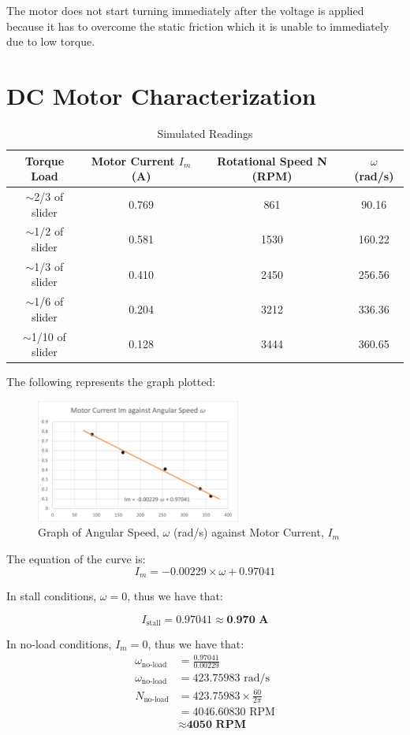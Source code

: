 \documentclass[a4paper,12pt,oneside, tikz]{book}
\begin{document}
The motor does not start turning immediately after the voltage is applied because it has to overcome the static friction which it is unable to immediately due to low torque.

\chapter{DC Motor Characterization}
\begin{table}[H]
    \centering
    \begin{tabular}{|c|c|c|c|}
         \hline Torque Load & Motor Current $I_m$ (A) & Rotational Speed N (RPM) & $\omega$ (rad/s)  \\
         \hline $\sim$2/3 of slider & 0.769 & 861 & 90.16 \\
         $\sim$1/2 of slider & 0.581 & 1530 & 160.22 \\
         $\sim$1/3 of slider & 0.410 & 2450 & 256.56 \\
         $\sim$1/6 of slider & 0.204 & 3212 & 336.36 \\
         $\sim$1/10 of slider & 0.128 & 3444 & 360.65 \\
         \hline
    \end{tabular}
    \caption{Simulated Readings}
    \label{tab:activity2}
\end{table}

The following represents the graph plotted:
\begin{figure}[H]
    \centering
    \includegraphics[width=0.6\textwidth]{images/activity2graph.png}
    \caption{Graph of Angular Speed, $\omega$ (rad/s) against Motor Current, $I_m$}
    \label{fig:activity2graph}
\end{figure}

The equation of the curve is:
$$I_m = -0.00229 \times \omega + 0.97041$$

In stall conditions, $\omega = 0$, thus we have that:

$$I_\text{stall} = 0.97041 \approx \textbf{0.970 A}$$

In no-load conditions, $I_m = 0$, thus we have that:
\begin{align*}
    \omega_\text{no-load} &= \frac{0.97041}{0.00229}\\
    \omega_\text{no-load} &= 423.75983\text{ rad/s} \\
    N_\text{no-load} &= 423.75983 \times \frac{60}{2\pi} \\
    &= 4046.60830\text{ RPM} \\
    &\approx \textbf{4050 RPM}
\end{align*}
\end{document}
